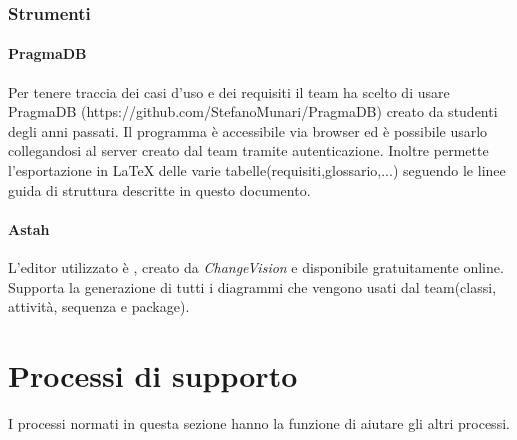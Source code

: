 	\subsubsection{Strumenti}
		\paragraph{PragmaDB}
		Per tenere traccia dei casi d'uso e dei requisiti il team ha scelto di usare PragmaDB (https://github.com/StefanoMunari/PragmaDB) creato da studenti degli anni passati. Il programma è accessibile via browser ed è possibile usarlo collegandosi al server creato dal team tramite autenticazione. Inoltre permette l'esportazione in \LaTeX{} delle varie tabelle(requisiti,glossario,...) seguendo le linee guida di struttura descritte in questo documento.
		\paragraph{Astah}
		L'editor  utilizzato è , creato da \textit{ChangeVision} e disponibile gratuitamente online. Supporta la generazione di tutti i diagrammi che vengono usati dal team(classi, attività, sequenza e package).



\section{Processi di supporto} \label{sec:supporto}
I processi normati in questa sezione hanno la funzione di aiutare gli altri processi.

